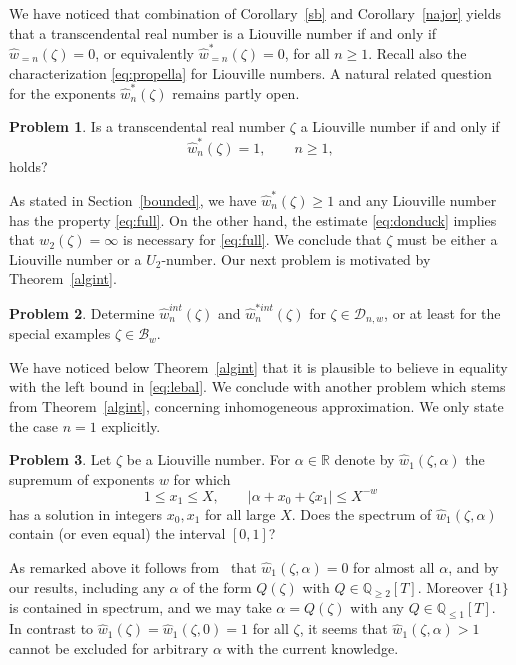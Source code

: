 \documentclass[12pt]{amsart}
\theoremstyle{definition}
\newtheorem{problem}{Problem}
\begin{document}
We have noticed that combination of Corollary~\ref{sb} and Corollary~\ref{najor} yields
that a transcendental real number is a Liouville number if and only if
$\widehat{w}_{=n}(\zeta)=0$, or equivalently $\widehat{w}_{=n}^{\ast}(\zeta)=0$, for all $n\geq 1$.
Recall also the characterization \eqref{eq:propella} for Liouville numbers.
A natural related question for the exponents $\widehat{w}_{n}^{\ast}(\zeta)$ remains partly open.

\begin{problem} \label{prob}
Is a transcendental real number $\zeta$ a Liouville number if and only if
%
\begin{equation} \label{eq:full}
\widehat{w}_{n}^{\ast}(\zeta)=1, \qquad  n\geq 1,
\end{equation}
%
holds?
\end{problem}

As stated in Section~\ref{bounded}, we have $\widehat{w}_{n}^{\ast}(\zeta)\geq 1$ and any Liouville number
has the property \eqref{eq:full}.
On the other hand, the estimate \eqref{eq:donduck} implies
that $w_{2}(\zeta)=\infty$ is necessary for \eqref{eq:full}.
We conclude that $\zeta$ must be either a Liouville number or a $U_{2}$-number.
Our next problem is motivated by Theorem~\ref{algint}.

\begin{problem}
Determine $\widehat{w}_{n}^{int}(\zeta)$ and $\widehat{w}_{n}^{\ast int}(\zeta)$
for $\zeta\in\mathscr{D}_{n,w}$, 
or at least for the special examples $\zeta\in\mathscr{B}_{w}$.
\end{problem}

We have noticed below Theorem~\ref{algint} that it is plausible to believe in equality with the left bound in \eqref{eq:lebal}.
We conclude with another problem which stems from Theorem~\ref{algint}, concerning inhomogeneous approximation.
We only state the case $n=1$ explicitly.

\begin{problem} \label{probo}
Let $\zeta$ be a Liouville number. For $\alpha\in\mathbb{R}$ 
denote by $\widehat{w}_{1}(\zeta,\alpha)$ the supremum of exponents $w$ for which
%
\[
1\leq x_{1} \leq X, \qquad  \vert \alpha+x_{0}+\zeta x_{1}\vert \leq X^{-w}
\]
%
has a solution in integers $x_{0},x_{1}$ for all large $X$. Does 
the spectrum of $\widehat{w}_{1}(\zeta,\alpha)$ contain (or even equal) the interval $[0,1]$?

\end{problem}

As remarked above it follows from~\cite{bula} that $\widehat{w}_{1}(\zeta,\alpha)=0$ for almost all $\alpha$, and by our results,
including any $\alpha$ of the form $Q(\zeta)$ with $Q\in\mathbb{Q}_{\geq 2}[T]$. Moreover $\{1\}$ is contained in 
spectrum, and we may take $\alpha=Q(\zeta)$ with any $Q\in\mathbb{Q}_{\leq 1}[T]$. In contrast to
$\widehat{w}_{1}(\zeta)=\widehat{w}_{1}(\zeta,0)=1$ 
for all $\zeta$, it seems that $\widehat{w}_{1}(\zeta,\alpha)>1$
cannot be excluded for arbitrary $\alpha$ with the current knowledge.
\end{document}

